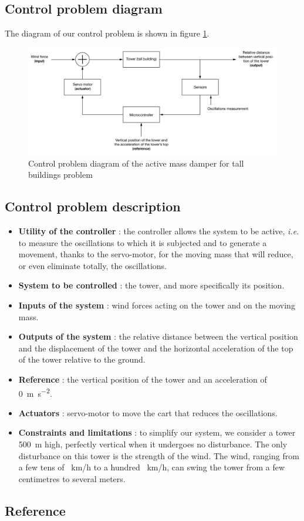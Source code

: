 \documentclass[a4paper, 12pt]{article}
\begin{document}
    \subsection{Control problem diagram}
    The diagram of our control problem is shown in figure \ref{fig:diagram}.
    \begin{figure}[!ht]
        \centering
        \includegraphics[width=1\textwidth]{resources/pdf/diagram.pdf}
        \caption{Control problem diagram of the active mass damper for tall buildings problem}
        \label{fig:diagram}
    \end{figure}
    
    \subsection{Control problem description}
    \begin{itemize}
        \item {\bf Utility of the controller} : the controller allows the system to be active, {\it i.e.} to measure the oscillations to which it is subjected and to generate a movement, thanks to the servo-motor, for the moving mass that will reduce, or even eliminate totally, the oscillations.
        \item {\bf System to be controlled} : the tower, and more specifically its position.
        \item {\bf Inputs of the system} : wind forces acting on the tower and on the moving mass.
        \item {\bf Outputs of the system} : the relative distance between the vertical position and the displacement of the tower and the horizontal acceleration of the top of the tower relative to the ground.
        \item {\bf Reference} : the vertical position of the tower and an acceleration of \SI{0}{\meter\per\second\squared}.
        \item {\bf Actuators} : servo-motor to move the cart that reduces the oscillations.
        \item {\bf Constraints and limitations} : to simplify our system, we consider a tower \SI{500}{\meter} high, perfectly vertical when it undergoes no disturbance. The only disturbance on this tower is the strength of the wind. The wind, ranging from a few tens of \SI{}{\kilo\meter/\hour} to a hundred \SI{}{\kilo\meter/\hour}, can swing the tower from a few centimetres to several meters.
    \end{itemize}
    
    \newpage
    \subsection{Reference}
    \nocite{*}
    \printbibliography
\end{document}
